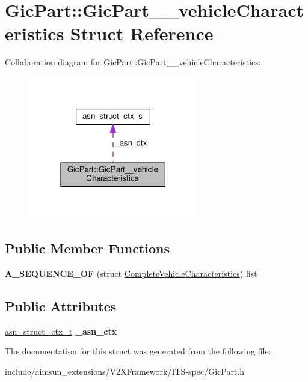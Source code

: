 \hypertarget{structGicPart_1_1GicPart____vehicleCharacteristics}{}\section{Gic\+Part\+:\+:Gic\+Part\+\_\+\+\_\+vehicle\+Characteristics Struct Reference}
\label{structGicPart_1_1GicPart____vehicleCharacteristics}


Collaboration diagram for Gic\+Part\+:\+:Gic\+Part\+\_\+\+\_\+vehicle\+Characteristics\+:\nopagebreak
\begin{figure}[H]
\begin{center}
\leavevmode
\includegraphics[width=210pt]{structGicPart_1_1GicPart____vehicleCharacteristics__coll__graph}
\end{center}
\end{figure}
\subsection*{Public Member Functions}
\begin{DoxyCompactItemize}
\item 
{\bfseries A\+\_\+\+S\+E\+Q\+U\+E\+N\+C\+E\+\_\+\+OF} (struct \hyperlink{structCompleteVehicleCharacteristics}{Complete\+Vehicle\+Characteristics}) list\hypertarget{structGicPart_1_1GicPart____vehicleCharacteristics_a88cfc03fde34c68cba366616e3c040c1}{}\label{structGicPart_1_1GicPart____vehicleCharacteristics_a88cfc03fde34c68cba366616e3c040c1}

\end{DoxyCompactItemize}
\subsection*{Public Attributes}
\begin{DoxyCompactItemize}
\item 
\hyperlink{structasn__struct__ctx__s}{asn\+\_\+struct\+\_\+ctx\+\_\+t} {\bfseries \+\_\+asn\+\_\+ctx}\hypertarget{structGicPart_1_1GicPart____vehicleCharacteristics_a98d809b638371e8a3117ad40d8dd0ed1}{}\label{structGicPart_1_1GicPart____vehicleCharacteristics_a98d809b638371e8a3117ad40d8dd0ed1}

\end{DoxyCompactItemize}


The documentation for this struct was generated from the following file\+:\begin{DoxyCompactItemize}
\item 
include/aimsun\+\_\+extensions/\+V2\+X\+Framework/\+I\+T\+S-\/spec/Gic\+Part.\+h\end{DoxyCompactItemize}
